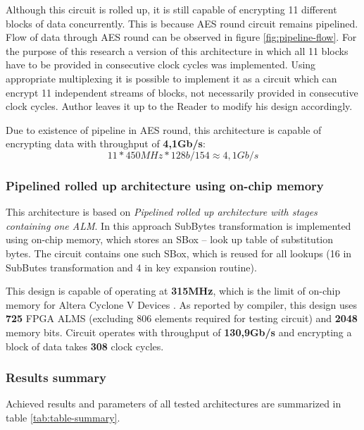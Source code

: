 Although this circuit is rolled up, it is still capable of encrypting 11 different blocks of data concurrently. This is because AES round circuit remains pipelined. Flow of data through AES round can be observed in figure \ref{fig:pipeline-flow}. For the purpose of this research a version of this architecture in which all 11 blocks have to be provided in consecutive clock cycles was implemented. Using appropriate multiplexing it is possible to implement it as a circuit which can encrypt 11 independent streams of blocks, not necessarily provided in consecutive clock cycles. Author leaves it up to the Reader to modify his design accordingly.

Due to existence of pipeline in AES round, this architecture is capable of encrypting data with throughput of \textbf{4,1Gb/s}:
\begin{equation}
11 * 450MHz * 128b / 154 \approx 4,1Gb/s
\end{equation}


\subsubsection{Pipelined rolled up architecture using on-chip memory}

This architecture is based on \textit {Pipelined rolled up architecture with stages containing one ALM}. In this approach SubBytes transformation is implemented using on-chip memory, which stores an SBox -- look up table of substitution bytes. The circuit contains one such SBox, which is reused for all lookups (16 in SubButes transformation and 4 in key expansion routine).

This design is capable of operating at \textbf{315MHz}, which is the limit of on-chip memory for Altera Cyclone V Devices \cite[Table 27]{cycloneVDatasheet}. As reported by compiler, this design uses \textbf{725} FPGA ALMS (excluding 806 elements required for testing circuit) and \textbf{2048} memory bits. Circuit operates with throughput of \textbf{130,9Gb/s} and encrypting a block of data takes \textbf{308} clock cycles.

\newpage

\subsubsection{Results summary}

Achieved results and parameters of all tested architectures are summarized in table \ref{tab:table-summary}.

